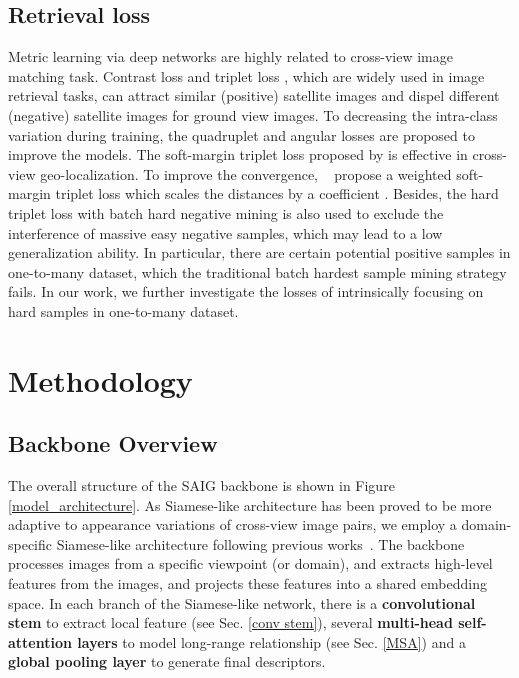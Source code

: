 \documentclass[sn-basic,iicol]{sn-jnl}
\theoremstyle{thmstyletwo}\newtheorem{example}{Example}\newtheorem{remark}{Remark}
\theoremstyle{thmstylethree}\newtheorem{definition}{Definition}
\begin{document}
\subsection{Retrieval loss}
Metric learning via deep networks are highly related to cross-view image matching task. Contrast loss \citep{varior2016gated} and triplet loss \citep{schroff2015facenet}, which are widely used in image retrieval tasks, can attract similar (positive) satellite images and dispel different (negative) satellite images for ground view images. To decreasing the intra-class variation during training, the quadruplet \citep{chen2017beyond} and angular losses \citep{wang2017deep} are proposed to improve the models. The soft-margin triplet loss proposed by \cite{vo2016localizing} is effective in cross-view geo-localization. To improve the convergence, ~\cite{hu2018cvm} propose a weighted soft-margin triplet loss which scales the distances by a coefficient . Besides, the hard triplet loss with batch hard negative mining \citep{hermans2017defense} is also used to exclude the interference of massive easy negative samples, which may lead to a low generalization ability. In particular, there are certain potential positive samples in one-to-many dataset, which the traditional batch hardest sample mining strategy fails. In our work, we further investigate the losses of intrinsically focusing on hard samples in one-to-many dataset. 


\section{Methodology}\label{sec3}
















 




\subsection{Backbone Overview}\label{overview}
The overall structure of the SAIG backbone is shown in Figure \ref{model_architecture}. As Siamese-like architecture has been proved to be more adaptive to appearance variations of cross-view image pairs, we employ a domain-specific Siamese-like architecture following previous works~\citep{hu2018cvm, SAFA2019,liu2019lending,CVFT2020}.
The backbone processes images from a specific viewpoint (or domain), and extracts high-level features from the images, and projects these features into a shared embedding space. 
In each branch of the Siamese-like network, there is a {\bf convolutional stem} to extract local feature (see Sec. \ref{conv stem}), several {\bf multi-head self-attention layers} to model long-range relationship (see Sec. \ref{MSA}) and a {\bf global pooling layer} to generate final descriptors. 
\end{document}
